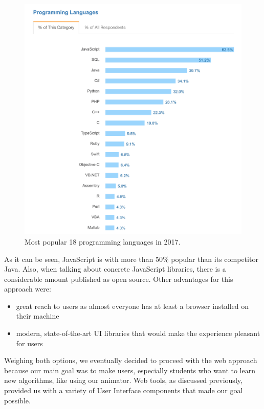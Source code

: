 \documentclass{l4proj}
\begin{document}
\begin{figure}[!ht]
    \centering
    \includegraphics[scale=0.5]{stack-overflow-languages}
    \caption{Most popular 18 programming languages in 2017.}
    \label{fig:stack-overflow-languages}
\end{figure}

As it can be seen, JavaScript is with more than 50\% popular than its competitor Java. Also, when talking about concrete JavaScript libraries, there is a considerable amount published as open source. Other advantages for this approach were:

\begin{itemize}
    \item great reach to users as almost everyone has at least a browser installed on their machine
    \item modern, state-of-the-art UI libraries that would make the experience pleasant for users
\end{itemize}

Weighing both options, we eventually decided to proceed with the web approach because our main goal was to make users, especially students who want to learn new algorithms, like using our animator. Web tools, as discussed previously, provided us with a variety of User Interface components that made our goal possible.
\end{document}
